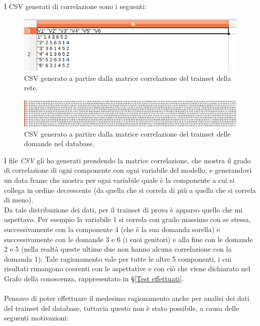 I CSV generati di correlazione sono i seguenti:

\begin{figure}[H]
\centering
	\includegraphics[width=0.60\linewidth]{../../PCA/plot/CSV_rete-prova.png}
	\caption{CSV generato a partire dalla matrice correlazione del trainset della rete.}
\end{figure}
\begin{figure}[H]
\centering
	\includegraphics[width=1\linewidth]{../../PCA/plot/CSV_rete-db.png}
	\caption{CSV generato a partire dalla matrice correlazione del trainset delle domande nel database.}
\end{figure}
\noindent
I file \textit{CSV} gli ho generati prendendo la matrice correlazione, che mostra il grado di correlazione di ogni componente con ogni variabile del modello, e generandovi un data frame che mostra per ogni variabile quale \`e la componente a cui si collega in ordine decrescente (da  quella che si correla di pi\`u a quella che si correla di meno).\\ 
Da tale distribuzione dei dati, per il trainset di prova \`e apparso quello che mi aspettavo. Per esempio la variabile 1 si correla con grado massimo con se stessa, successivamente con la componente 4 (che \`e la sua domanda sorella) e successivamente con le domande 3 e 6 (i suoi genitori) e alla fine con le domande 2 e 5 (nella realt\`a queste ultime due non hanno alcuna correlazione con la domanda 1). Tale ragionamento vale per tutte le altre  5 componenti, i cui risultati rimangono coerenti con le aspettative e con ci\`o che viene dichiarato nel Grafo della conoscenza, rappresentato in §\ref{Test effettuati}.\\\\
Pensavo di poter effettuare il medesimo ragionamento anche per analisi dei dati del trainset del database, tuttavia questo non \`e stato possibile, a causa delle seguenti motivazioni:
